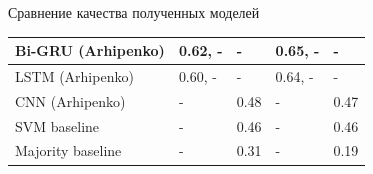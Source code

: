 \documentclass{beamer}
\begin{document}
\begin{frame}{Сравнение качества полученных моделей}
\begin{table}[]
{\begin{tabular}{l|l|l|l|l|}
\multicolumn{1}{|l|}{Bi-GRU (Arhipenko)}                                                                      & 0.62, -               & -    & 0.65, -                                              & -                                   \\ \hline
\multicolumn{1}{|l|}{LSTM (Arhipenko)}                                                                        & 0.60, -               & -    & 0.64, -                                              & -                                   \\ \hline
\multicolumn{1}{|l|}{CNN (Arhipenko)}                                                                         & -                     & 0.48 & -                                                    & 0.47                                \\ \hline
\multicolumn{1}{|l|}{SVM baseline}                                                                            & -                     & 0.46 & -                                                    & 0.46                                \\ \hline
\multicolumn{1}{|l|}{Majority baseline}                                                                       & -                     & 0.31 & -                                                    & 0.19                                \\ \hline
\end{tabular}
}
\end{table}

\end{frame}
\end{document}
